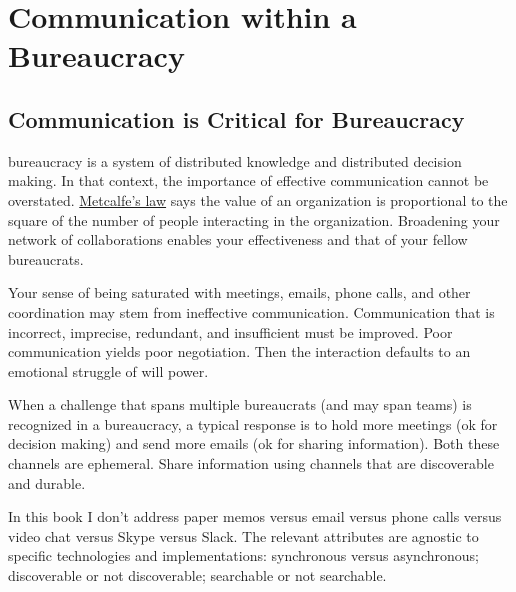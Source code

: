 \section{Communication within a Bureaucracy}

\subsection{Communication is Critical for Bureaucracy}
\gls{bureaucracy} is a system of distributed knowledge and distributed decision making. In that context, the importance of effective communication cannot be overstated. 
\href{https://en.wikipedia.org/wiki/Metcalfe\%27s_law}{Metcalfe's law} says the value of an organization is proportional to the square of the number of people interacting in the organization. Broadening your network of collaborations enables your effectiveness and that of your fellow bureaucrats. 

Your sense of being saturated with meetings, emails, phone calls, and other coordination may stem from ineffective communication. 
Communication that is incorrect, imprecise, redundant, and insufficient must be improved. 
Poor communication yields poor negotiation. Then the interaction defaults to an emotional struggle of will power. 

When a challenge that spans multiple bureaucrats (and may span teams) is recognized in a bureaucracy, a typical response is to hold more meetings (ok for decision making) and send more emails (ok for sharing information). Both these channels are ephemeral. Share information using channels that are discoverable and durable. 


In this book I don't address paper memos versus email versus phone calls versus video chat versus Skype versus Slack. 
The relevant attributes are agnostic to specific technologies and implementations: synchronous versus asynchronous; discoverable or not discoverable; searchable or not searchable. 


